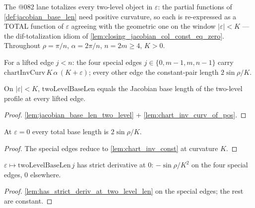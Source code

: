 The @082 lane totalizes every two-level object in $\varepsilon$: the partial
functions of \cref{def:jacobian_base_len} need positive curvature, so each is
re-expressed as a TOTAL function of $\varepsilon$ agreeing with the geometric
one on the window $|\varepsilon| < K$ --- the dif-totalization idiom of
\cref{lem:closing_jacobian_col_const_eq_zero}. Throughout $\rho = \pi/n$,
$\alpha = 2\pi/n$, $n = 2m \ge 4$, $K > 0$.

\begin{definition}
  \label{def:two_level_base_len}
  For a lifted edge $j < n$: the four special edges
  $j \in \{0, m{-}1, m, n{-}1\}$ carry
  $\mathrm{chartInvCurv}\,K\,\alpha\,(K+\varepsilon)$; every other edge the
  constant-pair length $2\sin\rho/K$.
\end{definition}

\begin{lemma}
  \label{lem:two_level_base_len_eq}
  On $|\varepsilon| < K$, $\mathrm{twoLevelBaseLen}$ equals the Jacobian base
  length of the two-level profile at every lifted edge.
\end{lemma}
\begin{proof}

\leanok
  \cref{lem:jacobian_base_len_two_level} + \cref{lem:chart_inv_curv_of_pos}.
\end{proof}

\begin{lemma}\leanok
[base length at $\varepsilon = 0$]
  \label{lem:two_level_base_len_zero}
  At $\varepsilon = 0$ every total base length is $2\sin\rho/K$.
\end{lemma}
\begin{proof}

\leanok
  The special edges reduce to \cref{lem:chart_inv_const} at curvature $K$.
\end{proof}

\begin{lemma}
  \label{lem:has_strict_deriv_at_two_level_base_len}
  $\varepsilon \mapsto \mathrm{twoLevelBaseLen}\,j$ has strict derivative at
  $0$: $-\sin\rho/K^2$ on the four special edges, $0$ elsewhere.
\end{lemma}
\begin{proof}

\leanok
  \cref{lem:has_strict_deriv_at_two_level_len} on the special edges; the rest
  are constant.
\end{proof}

